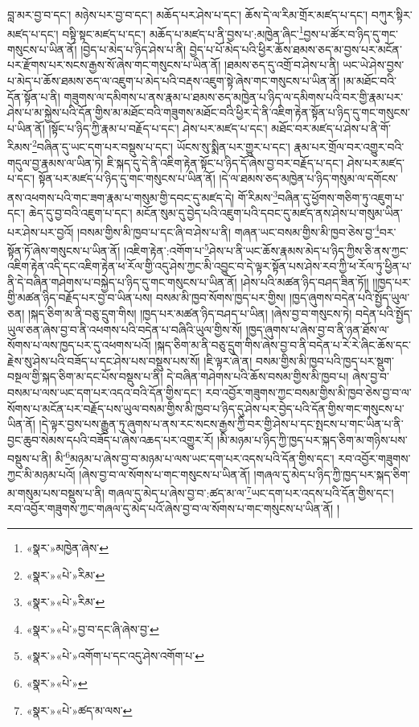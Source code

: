 བླ་མར་བྱ་བ་དང་། མཉེས་པར་བྱ་བ་དང་། མཆོད་པར་ཤེས་པ་དང་། ཆོས་དེ་ལ་རིམ་གྲོར་མཛད་པ་དང་། བཀུར་སྟིར་མཛད་པ་དང་། བསྟི་སྟང་མཛད་པ་དང་། མཆོད་པ་མཛད་པ་ནི་བྱས་པ་:མཁྱེན་ཞིང་\footnote{«སྣར་»མཁྱེན་ཞེས་}བྱས་པ་ཚོར་བ་ཉིད་དུ་གང་གསུངས་པ་ཡིན་ནོ། །བྱེད་པ་མེད་པ་ཉིད་ཤེས་པ་ནི། བྱེད་པ་པོ་མེད་པའི་ཕྱིར་ཆོས་ཐམས་ཅད་མ་བྱས་པར་མངོན་པར་རྫོགས་པར་སངས་རྒྱས་སོ་ཞེས་གང་གསུངས་པ་ཡིན་ནོ། །ཐམས་ཅད་དུ་འགྲོ་བ་ཤེས་པ་ནི། ཡང་ཡེ་ཤེས་བྱས་པ་མེད་པ་ཆོས་ཐམས་ཅད་ལ་འཇུག་པ་མེད་པའི་བརྡས་འཇུག་སྟེ་ཞེས་གང་གསུངས་པ་ཡིན་ནོ། །མ་མཐོང་བའི་དོན་སྟོན་པ་ནི། གཟུགས་ལ་དམིགས་པ་ནས་རྣམ་པ་ཐམས་ཅད་མཁྱེན་པ་ཉིད་ལ་དམིགས་པའི་བར་གྱི་རྣམ་པར་ཤེས་པ་མ་སྐྱེས་པའི་དོན་གྱིས་མ་མཐོང་བའི་གཟུགས་མཐོང་བའི་ཕྱིར་དེ་ནི་འཇིག་རྟེན་སྟོན་པ་ཉིད་དུ་གང་གསུངས་པ་ཡིན་ནོ། །སྟོང་པ་ཉིད་ཀྱི་རྣམ་པ་བརྗོད་པ་དང་། ཤེས་པར་མཛད་པ་དང་། མཐོང་བར་མཛད་པ་ཤེས་པ་ནི་གོ་རིམས་\footnote{«སྣར་»«པེ་»རིམ་}བཞིན་དུ་ཡང་དག་པར་བསྡུས་པ་དང་། ཡོངས་སུ་སྨིན་པར་གྱུར་པ་དང་། རྣམ་པར་གྲོལ་བར་འགྱུར་བའི་གདུལ་བྱ་རྣམས་ལ་ཡིན་ཏེ། ཇི་སྐད་དུ་དེ་ནི་འཇིག་རྟེན་སྟོང་པ་ཉིད་དོ་ཞེས་བྱ་བར་བརྗོད་པ་དང་། ཤེས་པར་མཛད་པ་དང་། སྟོན་པར་མཛད་པ་ཉིད་དུ་གང་གསུངས་པ་ཡིན་ནོ། །དེ་ལ་ཐམས་ཅད་མཁྱེན་པ་ཉིད་གསུམ་ལ་དགོངས་ནས་འཕགས་པའི་གང་ཟག་རྣམ་པ་གསུམ་གྱི་དབང་དུ་མཛད་དེ། གོ་རིམས་\footnote{«སྣར་»«པེ་»རིམ་}བཞིན་དུ་ཕྱོགས་གཅིག་ཏུ་འཇུག་པ་དང་། ཆེད་དུ་བྱ་བའི་འཇུག་པ་དང་། མངོན་སུམ་དུ་བྱེད་པའི་འཇུག་པའི་དབང་དུ་མཛད་ནས་ཤེས་པ་གསུམ་ཡིན་པར་ཤེས་པར་བྱའོ། །བསམ་གྱིས་མི་ཁྱབ་པ་དང་ཞི་བ་ཤེས་པ་ནི། གཞན་ཡང་བསམ་གྱིས་མི་ཁྱབ་ཅེས་བྱ་\footnote{«སྣར་»«པེ་»བྱ་བ་དང་ཞི་ཞེས་བྱ་}བར་སྟོན་ཏོ་ཞེས་གསུངས་པ་ཡིན་ནོ། །འཇིག་རྟེན་:འགོག་པ་\footnote{«སྣར་»«པེ་»འགོག་པ་དང་འདུ་ཤེས་འགོག་པ་}ཤེས་པ་ནི་ཡང་ཆོས་རྣམས་མེད་པ་ཉིད་ཀྱིས་ཅི་ནས་ཀྱང་འཇིག་རྟེན་འདི་དང་འཇིག་རྟེན་ཕ་རོལ་གྱི་འདུ་ཤེས་ཀྱང་མི་འབྱུང་བ་དེ་ལྟར་སྟོན་པས་ཤེས་རབ་ཀྱི་ཕ་རོལ་ཏུ་ཕྱིན་པ་ནི་དེ་བཞིན་གཤེགས་པ་བསྐྱེད་པ་ཉིད་དུ་གང་གསུངས་པ་ཡིན་ནོ། །ཤེས་པའི་མཚན་ཉིད་བཤད་ཟིན་ཏོ།། །།ཁྱད་པར་གྱི་མཚན་ཉིད་བརྗོད་པར་བྱ་བ་ཡིན་པས། བསམ་མི་ཁྱབ་སོགས་ཁྱད་པར་གྱིས། །ཁྱད་ཞུགས་བདེན་པའི་སྤྱོད་ཡུལ་ཅན། །སྐད་ཅིག་མ་ནི་བཅུ་དྲུག་གིས། །ཁྱད་པར་མཚན་ཉིད་བཤད་པ་ཡིན། །ཞེས་བྱ་བ་གསུངས་ཏེ། བདེན་པའི་སྤྱོད་ཡུལ་ཅན་ཞེས་བྱ་བ་ནི་འཕགས་པའི་བདེན་པ་བཞིའི་ཡུལ་གྱིས་སོ། །ཁྱད་ཞུགས་པ་ཞེས་བྱ་བ་ནི་ཉན་ཐོས་ལ་སོགས་པ་ལས་ཁྱད་པར་དུ་འཕགས་པའོ། །སྐད་ཅིག་མ་ནི་བཅུ་དྲུག་གིས་ཞེས་བྱ་བ་ནི་བདེན་པ་རེ་རེ་ཞིང་ཆོས་དང་རྗེས་སུ་ཤེས་པའི་བཟོད་པ་དང་ཤེས་པས་བསྡུས་པས་སོ། །ཇི་ལྟར་ཞེ་ན། བསམ་གྱིས་མི་ཁྱབ་པའི་ཁྱད་པར་སྡུག་བསྔལ་གྱི་སྐད་ཅིག་མ་དང་པོས་བསྡུས་པ་ནི། དེ་བཞིན་གཤེགས་པའི་ཆོས་བསམ་གྱིས་མི་ཁྱབ་པ། ཞེས་བྱ་བ་བསམ་པ་ལས་ཡང་དག་པར་འདའ་བའི་དོན་གྱིས་དང་། རབ་འབྱོར་གཟུགས་ཀྱང་བསམ་གྱིས་མི་ཁྱབ་ཅེས་བྱ་བ་ལ་སོགས་པ་མངོན་པར་བརྗོད་པས་ཡུལ་བསམ་གྱིས་མི་ཁྱབ་པ་ཉིད་དུ་ཤེས་པར་བྱེད་པའི་དོན་གྱིས་གང་གསུངས་པ་ཡིན་ནོ། །དེ་ལྟར་བྱས་པས་རྒྱུན་ཏུ་ཞུགས་པ་ནས་རང་སངས་རྒྱས་ཀྱི་བར་གྱི་ཤེས་པ་དང་སྤངས་པ་གང་ཡིན་པ་ནི་བྱང་ཆུབ་སེམས་དཔའི་བཟོད་པ་ཞེས་འཆད་པར་འགྱུར་རོ། །མི་མཉམ་པ་ཉིད་ཀྱི་ཁྱད་པར་སྐད་ཅིག་མ་གཉིས་པས་བསྡུས་པ་ནི། མི་\footnote{«སྣར་»«པེ་»}མཉམ་པ་ཞེས་བྱ་བ་མཉམ་པ་ལས་ཡང་དག་པར་འདས་པའི་དོན་གྱིས་དང་། རབ་འབྱོར་གཟུགས་ཀྱང་མི་མཉམ་པའོ། །ཞེས་བྱ་བ་ལ་སོགས་པ་གང་གསུངས་པ་ཡིན་ནོ། །གཞལ་དུ་མེད་པ་ཉིད་ཀྱི་ཁྱད་པར་སྐད་ཅིག་མ་གསུམ་པས་བསྡུས་པ་ནི། གཞལ་དུ་མེད་པ་ཞེས་བྱ་བ་:ཚད་མ་ལ་\footnote{«སྣར་»«པེ་»ཚད་མ་ལས་}ཡང་དག་པར་འདས་པའི་དོན་གྱིས་དང་། རབ་འབྱོར་གཟུགས་ཀྱང་གཞལ་དུ་མེད་པའོ་ཞེས་བྱ་བ་ལ་སོགས་པ་གང་གསུངས་པ་ཡིན་ནོ། །
